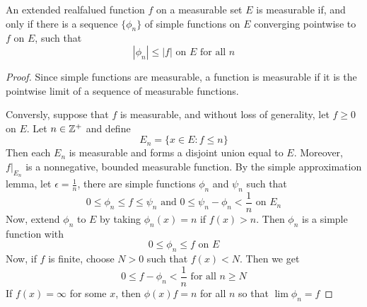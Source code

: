 \begin{theorem}\label{9.2.3}
    An extended realfalued function $f$ on a measurable set  $E$ is measurable
    if, and only if there is a sequence $\{\phi_n\}$ of simple functions on $E$
    converging pointwise to $f$ on $E$, such that
    \begin{equation*}
        |\phi_n| \leq |f| \text{ on } E \text{ for all } n
    \end{equation*}
\end{theorem}
\begin{proof}
    Since simple functions are measurable, a function is measurable if it is the
    pointwise limit of a sequence of measurable functions.

    Conversly, suppose that $f$ is measurable, and without loss of generality,
    let  $f \geq 0$ on  $E$. Let  $n \in \mathbb{Z}^+$ and define
    \begin{equation*}
        E_n=\{x \in E : f \leq n\}
    \end{equation*}
    Then each $E_n$ is measurable and forms a disjoint union equal to $E$.
    Moreover,  $f|_{E_n}$ is a nonnegative, bounded measurable function. By the
    simple approximation lemma, let $\epsilon=\frac{1}{n}$, there are simple
    functions $\phi_n$ and  $\psi_n$ such that
    \begin{equation*}
        0 \leq \phi_n \leq f \leq \psi_n \text{ and } 0 \leq \psi_n-\phi_n <
        \frac{1}{n} \text{ on } E_n
    \end{equation*}
    Now, extend $\phi_n$ to $E$ by taking  $\phi_n(x)=n$ if $f(x)>n$. Then
    $\phi_n$ is a simple function with
    \begin{equation*}
        0 \leq \phi_n \leq f \text{ on } E
    \end{equation*}
    Now, if $f$ is finite, choose  $N>0$ such that  $f(x)<N$. Then we get
    \begin{equation*}
        0 \leq f-\phi_n < \frac{1}{n} \text{ for all } n \geq N
    \end{equation*}
    If $f(x)=\infty$ for some $x$, then  $\phi(x)f=n$ for all $n$ so that
    $\lim{\phi_n}=f$
\end{proof}
